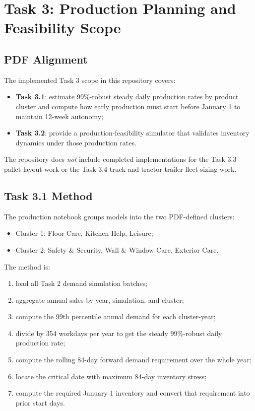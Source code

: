 \documentclass[11pt]{article}
\begin{document}
\section{Task 3: Production Planning and Feasibility Scope}

\subsection{PDF Alignment}

The implemented Task 3 scope in this repository covers:
\begin{itemize}
  \item \textbf{Task 3.1}: estimate 99\%-robust steady daily production rates by product cluster and
  compute how early production must start before January 1 to maintain 12-week autonomy;
  \item \textbf{Task 3.2}: provide a production-feasibility simulator that validates inventory dynamics
  under those production rates.
\end{itemize}

The repository does \emph{not} include completed implementations for the Task 3.3 pallet
layout work or the Task 3.4 truck and tractor-trailer fleet sizing work.

\subsection{Task 3.1 Method}

The production notebook groups models into the two PDF-defined clusters:
\begin{itemize}
  \item Cluster 1: Floor Care, Kitchen Help, Leisure;
  \item Cluster 2: Safety \& Security, Wall \& Window Care, Exterior Care.
\end{itemize}

The method is:
\begin{enumerate}
  \item load all Task 2 demand simulation batches;
  \item aggregate annual sales by year, simulation, and cluster;
  \item compute the 99th percentile annual demand for each cluster-year;
  \item divide by 354 workdays per year to get the steady 99\%-robust daily production rate;
  \item compute the rolling 84-day forward demand requirement over the whole year;
  \item locate the critical date with maximum 84-day inventory stress;
  \item compute the required January 1 inventory and convert that requirement into prior start days.
\end{enumerate}
\end{document}

